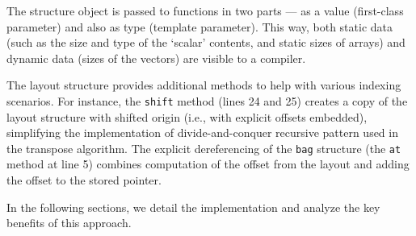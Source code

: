 The structure object is passed to functions in two parts --- as a value (first-class parameter) and also as type (template parameter). This way, both static data (such as the size and type of the `scalar' contents, and static sizes of arrays) and dynamic data (sizes of the vectors) are visible to a compiler.

The layout structure provides additional methods to help with various indexing scenarios. For instance, the \texttt{shift} method (lines 24 and 25) creates a copy of the layout structure with shifted origin (i.e., with explicit offsets embedded), simplifying the implementation of divide-and-conquer recursive pattern used in the transpose algorithm. The explicit dereferencing of the \texttt{bag} structure (the \texttt{at} method at line 5) combines computation of the offset from the layout and adding the offset to the stored pointer.

In the following sections, we detail the implementation and analyze the key benefits of this approach.
